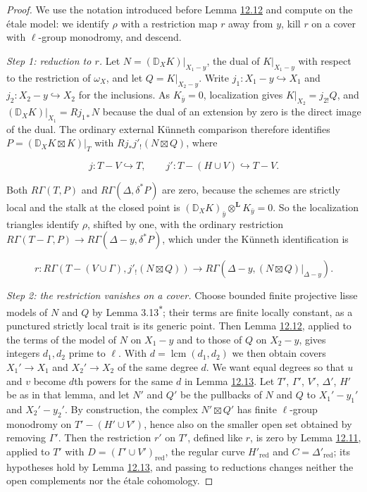 \documentclass[11pt]{article}
\newcommand{\bpout}[1]{#1\textsuperscript{\hyperlink{bp-outside}{\ensuremath{\ast}}}}
\begin{document}
\begin{proof}[{Proof}]\label{bp46}%
We use the notation introduced before Lemma \hyperref[bp38]{12.12} and compute on the étale model: we identify \(\rho\) with a restriction map \(r\) away from \(y\), kill \(r\) on a cover with \(\ell\)-group monodromy, and descend.

\emph{Step 1: reduction to \(r\).} Let \(N=(\mathbb D_XK)|_{X_1-y}\), the dual of \(K|_{X_1-y}\) with respect to the restriction of \(\omega_X\), and let \(Q=K|_{X_2-y}\). Write \(j_1:X_1-y\hookrightarrow X_1\) and \(j_2:X_2-y\hookrightarrow X_2\) for the inclusions. As \(K_{\bar y}=0\), localization gives \(K|_{X_2}=j_{2!}Q\), and \((\mathbb D_XK)|_{X_1}=Rj_{1*}N\) because the dual of an extension by zero is the direct image of the dual. The ordinary external Künneth comparison therefore identifies \(P=(\mathbb D_XK\boxtimes K)|_T\) with \(Rj_*j'_!(N\boxtimes Q)\), where

\[
j:T-V\hookrightarrow T,\qquad
j':T-(H\cup V)\hookrightarrow T-V.
\]

Both \(R\Gamma(T,P)\) and \(R\Gamma(\Delta,\delta^*P)\) are zero, because the schemes are strictly local and the stalk at the closed point is \((\mathbb D_XK)_{\bar y}\otimes^{\mathbf L} K_{\bar y}=0\). So the localization triangles identify \(\rho\), shifted by one, with the ordinary restriction \(R\Gamma(T-\Gamma,P)\to R\Gamma(\Delta-y,\delta^*P)\), which under the Künneth identification is

\[
r:R\Gamma(T-(V\cup\Gamma),j'_!(N\boxtimes Q))
\longrightarrow R\Gamma(\Delta-y,(N\boxtimes Q)|_{\Delta-y}).
\]

\emph{Step 2: the restriction vanishes on a cover.} Choose bounded finite projective lisse models of \(N\) and \(Q\) by Lemma \bpout{3.13}; their terms are finite locally constant, as a punctured strictly local trait is its generic point. Then Lemma \hyperref[bp38]{12.12}, applied to the terms of the model of \(N\) on \(X_1-y\) and to those of \(Q\) on \(X_2-y\), gives integers \(d_1,d_2\) prime to \(\ell\). With \(d=\operatorname{lcm}(d_1,d_2)\) we then obtain covers \(X_1'\to X_1\) and \(X_2'\to X_2\) of the same degree \(d\). We want equal degrees so that \(u\) and \(v\) become \(d\)th powers for the same \(d\) in Lemma \hyperref[bp40]{12.13}. Let \(T'\), \(\Gamma'\), \(V'\), \(\Delta'\), \(H'\) be as in that lemma, and let \(N'\) and \(Q'\) be the pullbacks of \(N\) and \(Q\) to \(X_1'-y_1'\) and \(X_2'-y_2'\). By construction, the complex \(N'\boxtimes Q'\) has finite \(\ell\)-group monodromy on \(T'-(H'\cup V')\), hence also on the smaller open set obtained by removing \(\Gamma'\). Then the restriction \(r'\) on \(T'\), defined like \(r\), is zero by Lemma \hyperref[bp34]{12.11}, applied to \(T'\) with \(D=(\Gamma'\cup V')_{\mathrm{red}}\), the regular curve \(H'_{\mathrm{red}}\) and \(C=\Delta'_{\mathrm{red}}\); its hypotheses hold by Lemma \hyperref[bp40]{12.13}, and passing to reductions changes neither the open complements nor the étale cohomology.


\end{proof}
\end{document}
